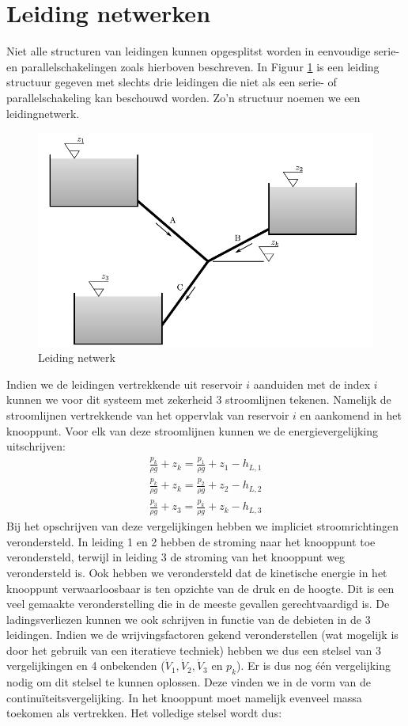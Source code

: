 	\section{Leiding netwerken}
	\label{sec:Leiding netwerken}	
Niet alle structuren van leidingen kunnen opgesplitst worden in eenvoudige serie- en parallelschakelingen zoals hierboven beschreven. In Figuur \ref{fig:leidingnetwerk} is een leiding structuur gegeven met slechts drie leidingen die niet als een serie- of parallelschakeling kan beschouwd worden. Zo'n structuur noemen we een leidingnetwerk.
\begin{figure}
	\centering
	\includegraphics{fig/leidingstelsels/Leidingnetwerk}
	\caption{Leiding netwerk}
	\label{fig:leidingnetwerk}
\end{figure}
Indien we de leidingen vertrekkende uit reservoir $i$ aanduiden met de index $i$ kunnen we voor dit systeem met zekerheid 3 stroomlijnen tekenen. Namelijk de stroomlijnen vertrekkende van het oppervlak van reservoir $i$ en aankomend in het knooppunt. Voor elk van deze stroomlijnen kunnen we de energievergelijking uitschrijven:
\begin{eqnarray}
	\frac{p_k}{\rho g} + z_k = \frac{p_1}{\rho g} + z_1 - h_{L,1} \nonumber \\
	\frac{p_k}{\rho g} + z_k = \frac{p_2}{\rho g} + z_2 - h_{L,2} \\
	\frac{p_3}{\rho g} + z_3 = \frac{p_k}{\rho g} + z_k - h_{L,3} \nonumber
\end{eqnarray} 
Bij het opschrijven van deze vergelijkingen hebben we impliciet stroomrichtingen verondersteld. In leiding 1 en 2 hebben de stroming naar het knooppunt toe verondersteld, terwijl in leiding 3 de stroming van het knooppunt weg verondersteld is. Ook hebben we verondersteld dat de kinetische energie in het knooppunt verwaarloosbaar is ten opzichte van de druk en de hoogte. Dit is een veel gemaakte veronderstelling die in de meeste gevallen gerechtvaardigd is. De ladingsverliezen kunnen we ook schrijven in functie van de debieten in de 3 leidingen. Indien we de wrijvingsfactoren gekend veronderstellen (wat mogelijk is door het gebruik van een iteratieve techniek) hebben we dus een stelsel van 3 vergelijkingen en 4 onbekenden ($\dot{V}_1,\dot{V}_2,\dot{V}_3$ en $p_k$). Er is dus nog één vergelijking nodig om dit stelsel te kunnen oplossen. Deze vinden we in de vorm van de continuïteitsvergelijking. In het knooppunt moet namelijk evenveel massa toekomen als vertrekken. Het volledige stelsel wordt dus:
